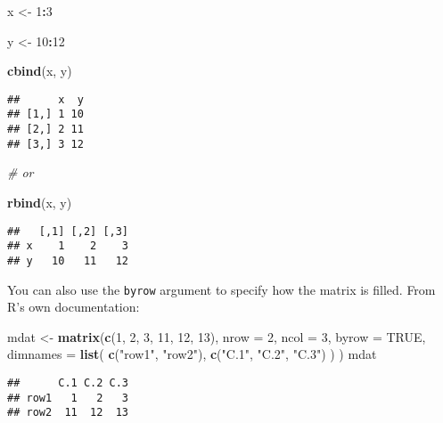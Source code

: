 \documentclass[
]{book}
\newenvironment{Shaded}{\begin{snugshade}}{\end{snugshade}}
\newcommand{\CommentTok}[1]{\textcolor[rgb]{0.56,0.35,0.01}{\textit{#1}}}
\newcommand{\DataTypeTok}[1]{\textcolor[rgb]{0.13,0.29,0.53}{#1}}
\newcommand{\DecValTok}[1]{\textcolor[rgb]{0.00,0.00,0.81}{#1}}
\newcommand{\KeywordTok}[1]{\textcolor[rgb]{0.13,0.29,0.53}{\textbf{#1}}}
\newcommand{\NormalTok}[1]{#1}
\newcommand{\OperatorTok}[1]{\textcolor[rgb]{0.81,0.36,0.00}{\textbf{#1}}}
\newcommand{\OtherTok}[1]{\textcolor[rgb]{0.56,0.35,0.01}{#1}}
\newcommand{\StringTok}[1]{\textcolor[rgb]{0.31,0.60,0.02}{#1}}
\begin{document}
\begin{Shaded}
\begin{Highlighting}[]
\NormalTok{x \textless{}{-}}\StringTok{ }\DecValTok{1}\OperatorTok{:}\DecValTok{3}

\NormalTok{y \textless{}{-}}\StringTok{ }\DecValTok{10}\OperatorTok{:}\DecValTok{12}

\KeywordTok{cbind}\NormalTok{(x, y)}
\end{Highlighting}
\end{Shaded}

\begin{verbatim}
##      x  y
## [1,] 1 10
## [2,] 2 11
## [3,] 3 12
\end{verbatim}

\begin{Shaded}
\begin{Highlighting}[]
\CommentTok{\# or}

\KeywordTok{rbind}\NormalTok{(x, y)}
\end{Highlighting}
\end{Shaded}

\begin{verbatim}
##   [,1] [,2] [,3]
## x    1    2    3
## y   10   11   12
\end{verbatim}

You can also use the \texttt{byrow} argument to specify how the matrix is filled. From R's own documentation:

\begin{Shaded}
\begin{Highlighting}[]
\NormalTok{mdat \textless{}{-}}\StringTok{ }\KeywordTok{matrix}\NormalTok{(}\KeywordTok{c}\NormalTok{(}\DecValTok{1}\NormalTok{, }\DecValTok{2}\NormalTok{, }\DecValTok{3}\NormalTok{, }\DecValTok{11}\NormalTok{, }\DecValTok{12}\NormalTok{, }\DecValTok{13}\NormalTok{),}
  \DataTypeTok{nrow =} \DecValTok{2}\NormalTok{,}
  \DataTypeTok{ncol =} \DecValTok{3}\NormalTok{,}
  \DataTypeTok{byrow =} \OtherTok{TRUE}\NormalTok{,}
  \DataTypeTok{dimnames =} \KeywordTok{list}\NormalTok{(}
    \KeywordTok{c}\NormalTok{(}\StringTok{"row1"}\NormalTok{, }\StringTok{"row2"}\NormalTok{),}
    \KeywordTok{c}\NormalTok{(}\StringTok{"C.1"}\NormalTok{, }\StringTok{"C.2"}\NormalTok{, }\StringTok{"C.3"}\NormalTok{)}
\NormalTok{  )}
\NormalTok{)}
\NormalTok{mdat}
\end{Highlighting}
\end{Shaded}

\begin{verbatim}
##      C.1 C.2 C.3
## row1   1   2   3
## row2  11  12  13
\end{verbatim}
\end{document}
